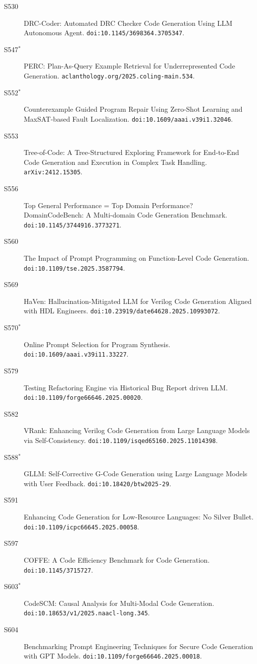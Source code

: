 {\begin{description}
\item[S530] DRC-Coder: Automated DRC Checker Code Generation Using LLM Autonomous Agent. \texttt{doi:10.1145/3698364.3705347}.
\item[S547$^\ast$] PERC: Plan-As-Query Example Retrieval for Underrepresented Code Generation. \texttt{aclanthology.org/2025.coling-main.534}.
\item[S552$^\ast$] Counterexample Guided Program Repair Using Zero-Shot Learning and MaxSAT-based Fault Localization. \texttt{doi:10.1609/aaai.v39i1.32046}.
\item[S553] Tree-of-Code: A Tree-Structured Exploring Framework for End-to-End Code Generation and Execution in Complex Task Handling. \texttt{arXiv:2412.15305}.
\item[S556] Top General Performance = Top Domain Performance? DomainCodeBench: A Multi-domain Code Generation Benchmark. \texttt{doi:10.1145/3744916.3773271}.
\item[S560] The Impact of Prompt Programming on Function-Level Code Generation. \texttt{doi:10.1109/tse.2025.3587794}.
\item[S569] HaVen: Hallucination-Mitigated LLM for Verilog Code Generation Aligned with HDL Engineers. \texttt{doi:10.23919/date64628.2025.10993072}.
\item[S570$^\ast$] Online Prompt Selection for Program Synthesis. \texttt{doi:10.1609/aaai.v39i11.33227}.
\item[S579] Testing Refactoring Engine via Historical Bug Report driven LLM. \texttt{doi:10.1109/forge66646.2025.00020}.
\item[S582] VRank: Enhancing Verilog Code Generation from Large Language Models via Self-Consistency. \texttt{doi:10.1109/isqed65160.2025.11014398}.
\item[S588$^\ast$] GLLM: Self-Corrective G-Code Generation using Large Language Models with User Feedback. \texttt{doi:10.18420/btw2025-29}.
\item[S591] Enhancing Code Generation for Low-Resource Languages: No Silver Bullet. \texttt{doi:10.1109/icpc66645.2025.00058}.
\item[S597] COFFE: A Code Efficiency Benchmark for Code Generation. \texttt{doi:10.1145/3715727}.
\item[S603$^\ast$] CodeSCM: Causal Analysis for Multi-Modal Code Generation. \texttt{doi:10.18653/v1/2025.naacl-long.345}.
\item[S604] Benchmarking Prompt Engineering Techniques for Secure Code Generation with GPT Models. \texttt{doi:10.1109/forge66646.2025.00018}.

\end{description}}
